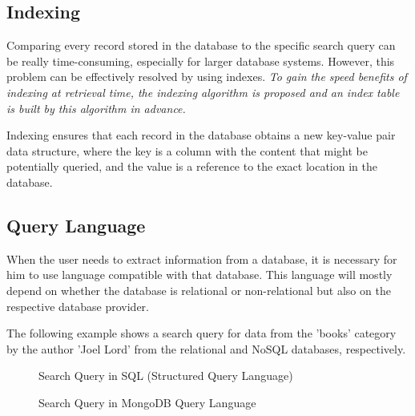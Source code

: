 \documentclass[12pt, a4paper]{article}
\begin{document}
    \subsection{Indexing}
        Comparing every record stored in the database to the specific search query can be really time-consuming, especially for larger database systems. However, this problem can be effectively resolved by using indexes. \textit{To gain the speed benefits of indexing at retrieval time, the indexing algorithm is proposed and an index table is built by this algorithm in advance.}\cite{15}\par Indexing ensures that each record in the database obtains a new key-value pair data structure, where the key is a column with the content that might be potentially queried, and the value is a reference to the exact location in the database.
    
    \subsection{Query Language}
        When the user needs to extract information from a database, it is necessary for him to use language compatible with that database. This language will mostly depend on whether the database is relational or non-relational but also on the respective database provider.\par The following example shows a search query for data from the 'books' category by the author 'Joel Lord' from the relational and NoSQL databases, respectively.\\

    \begin{figure}[h]
        \centering
        \caption{Search Query in SQL (Structured Query Language)\cite{101}}
        \label{fig:sql}
    \end{figure}

    \begin{figure}[h]
        \centering
        \caption{Search Query in MongoDB Query Language\cite{101}}
        \label{fig:mongodb}
    \end{figure}
\clearpage
\end{document}
